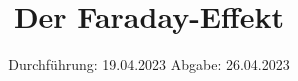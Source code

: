 

\subject{v46}
\title{Der Faraday-Effekt}
\date{%
  Durchführung: 19.04.2023
  \hspace{3em}
  Abgabe: 26.04.2023
}



\maketitle
\thispagestyle{empty}
\tableofcontents
\newpage






\printbibliography{}


